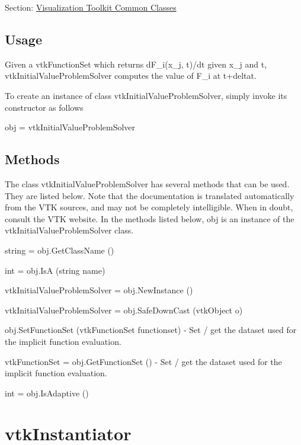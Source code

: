 Section\-: \hyperlink{sec_vtkcommon}{Visualization Toolkit Common Classes} \hypertarget{vtkwidgets_vtkxyplotwidget_Usage}{}\subsection{Usage}\label{vtkwidgets_vtkxyplotwidget_Usage}
Given a vtk\-Function\-Set which returns d\-F\-\_\-i(x\-\_\-j, t)/dt given x\-\_\-j and t, vtk\-Initial\-Value\-Problem\-Solver computes the value of F\-\_\-i at t+deltat.

To create an instance of class vtk\-Initial\-Value\-Problem\-Solver, simply invoke its constructor as follows \begin{DoxyVerb}  obj = vtkInitialValueProblemSolver
\end{DoxyVerb}
 \hypertarget{vtkwidgets_vtkxyplotwidget_Methods}{}\subsection{Methods}\label{vtkwidgets_vtkxyplotwidget_Methods}
The class vtk\-Initial\-Value\-Problem\-Solver has several methods that can be used. They are listed below. Note that the documentation is translated automatically from the V\-T\-K sources, and may not be completely intelligible. When in doubt, consult the V\-T\-K website. In the methods listed below, {\ttfamily obj} is an instance of the vtk\-Initial\-Value\-Problem\-Solver class. 
\begin{DoxyItemize}
\item {\ttfamily string = obj.\-Get\-Class\-Name ()}  
\item {\ttfamily int = obj.\-Is\-A (string name)}  
\item {\ttfamily vtk\-Initial\-Value\-Problem\-Solver = obj.\-New\-Instance ()}  
\item {\ttfamily vtk\-Initial\-Value\-Problem\-Solver = obj.\-Safe\-Down\-Cast (vtk\-Object o)}  
\item {\ttfamily obj.\-Set\-Function\-Set (vtk\-Function\-Set functionset)} -\/ Set / get the dataset used for the implicit function evaluation.  
\item {\ttfamily vtk\-Function\-Set = obj.\-Get\-Function\-Set ()} -\/ Set / get the dataset used for the implicit function evaluation.  
\item {\ttfamily int = obj.\-Is\-Adaptive ()}  
\end{DoxyItemize}\hypertarget{vtkcommon_vtkinstantiator}{}\section{vtk\-Instantiator}\label{vtkcommon_vtkinstantiator}
